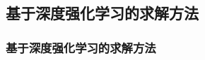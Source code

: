 \documentclass[10pt, aspectratio=169]{beamer}  %
\begin{document}
\subsection{基于深度强化学习的求解方法}
\begin{frame}
	\frametitle{基于深度强化学习的求解方法}
	\begin{columns}
		\begin{column}{0.5\textwidth}
			\centering
			
		\end{column}
		\begin{column}{0.5\textwidth}
			\centering
			
		\end{column}
	\end{columns}
\end{frame}
\end{document}
